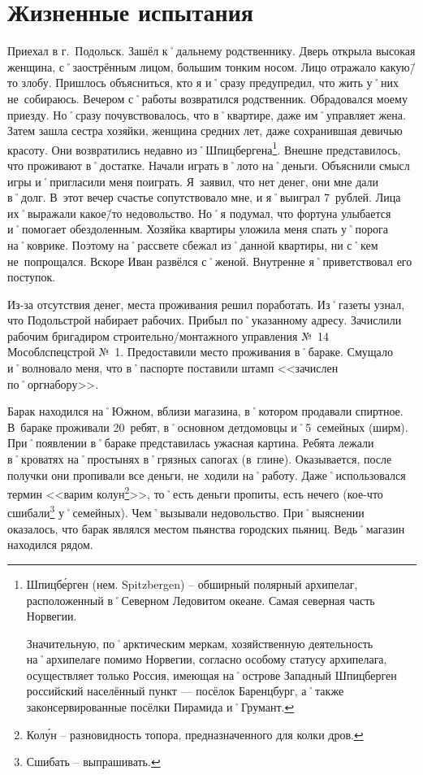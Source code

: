 ﻿\chapter{Жизненные испытания}

Приехал в г.~Подольск. Зашёл к˚дальнему родственнику. Дверь открыла высокая женщина, с˚заострённым лицом, большим тонким носом. Лицо отражало какую\=/то злобу. Пришлось объясниться, кто я и˚сразу предупредил, что жить у˚них не~собираюсь. Вечером с˚работы возвратился родственник. Обрадовался моему приезду. Но˚сразу почувствовалось, что в˚квартире, даже им˚управляет жена. Затем зашла сестра хозяйки, женщина средних лет, даже сохранившая девичью красоту. Они возвратились недавно из˚Шпицбергена\footnote{Шпицб\'{е}рген (нем. Spitzbergen) \--- обширный полярный архипелаг, расположенный в˚Северном Ледовитом океане. Самая северная часть Норвегии. 

Значительную, по˚арктическим меркам, хозяйственную деятельность на˚архипелаге помимо Норвегии, согласно особому статусу архипелага, осуществляет только Россия, имеющая на˚острове Западный Шпицберген российский населённый пункт — посёлок Баренцбург, а˚также законсервированные посёлки Пирамида и˚Грумант.}. 
Внешне представилось, что проживают в˚достатке. Начали играть в˚лото на˚деньги. Объяснили смысл игры и˚пригласили меня поиграть. Я~заявил, что нет денег, они мне дали в˚долг. В~этот вечер счастье сопутствовало мне, и я˚выиграл 7~рублей. Лица их˚выражали какое\=/то недовольство. Но˚я подумал, что фортуна улыбается и˚помогает обездоленным. Хозяйка квартиры уложила меня спать у˚порога на˚коврике. Поэтому на˚рассвете сбежал из˚данной квартиры, ни с˚кем не~попрощался. Вскоре Иван развёлся с˚женой. Внутренне я˚приветствовал его поступок.

Из-за отсутствия денег, места проживания решил поработать. Из˚газеты узнал, что Подольстрой набирает рабочих. Прибыл по˚указанному адресу. Зачислили рабочим бригадиром строительно\-/монтажного управления №~14 Мособлспецстрой №~1. Предоставили место проживания в˚бараке. Смущало и˚волновало меня, что в˚паспорте поставили штамп <<зачислен по˚оргнабору>>. 

Барак находился на˚Южном, вблизи магазина, в˚котором продавали спиртное. В~бараке проживали 20~ребят, в˚основном детдомовцы и˚5~семейных (ширм). При˚появлении в˚бараке представилась ужасная картина. Ребята лежали в˚кроватях на˚простынях в˚грязных сапогах (в~глине). Оказывается, после получки они пропивали все деньги, не~ходили на˚работу. Даже˚использовался термин <<варим колун\footnote{Кол\'{у}н \--- разновидность топора, предназначенного для колки дров.}>>, то˚есть деньги пропиты, есть нечего (кое-что сшибали\footnote{Сшибать \--- выпрашивать.} у˚семейных). Чем˚вызывали недовольство. При˚выяснении оказалось, что барак являлся местом пьянства городских пьяниц. Ведь˚магазин находился рядом. 

